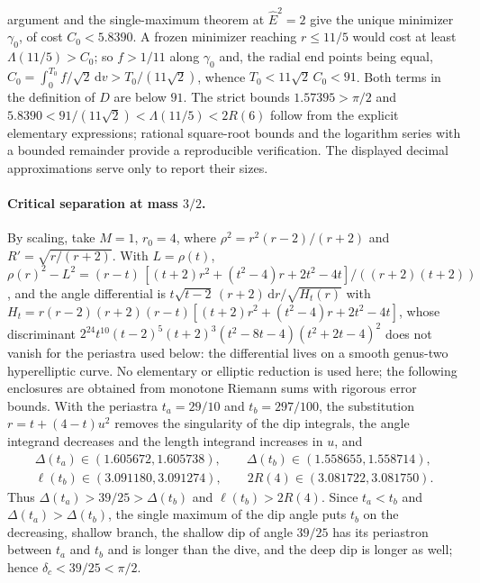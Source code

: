 \documentclass[aip,jmp,amsmath,amssymb,reprint]{revtex4-2}
\newcommand{\Ehat}{\hat E}
\newcommand{\dd}{\mathrm{d}}
\theoremstyle{plain}
\theoremstyle{definition}
\begin{document}
argument and the single-maximum theorem at $\Ehat^2=2$ give the unique minimizer $\gamma_0$, of cost
$C_0<5.8390$. A frozen minimizer reaching $r\le11/5$ would cost at least $\Lambda(11/5)>C_0$; so $f>1/11$ along $\gamma_0$
and, the radial end points being equal, $C_0=\int_0^{T_0}f/\sqrt2\,\dd v>T_0/(11\sqrt2)$, whence $T_0<11\sqrt2\,C_0<91$.
Both terms in the definition of $D$ are below $91$. The strict bounds $1.57395>\pi/2$ and
$5.8390<91/(11\sqrt2)<\Lambda(11/5)<2R(6)$ follow from the explicit elementary expressions; rational square-root
bounds and the logarithm series with a bounded remainder provide a reproducible verification. The
displayed decimal approximations serve only to report their sizes.

\paragraph{Critical separation at mass $3/2$.} By scaling, take $M=1$, $r_0=4$, where
$\rho^2=r^2(r-2)/(r+2)$ and $R'=\sqrt{r/(r+2)}$. With $L=\rho(t)$, $\rho(r)^2-L^2=(r-t)\,[(t+2)r^2+(t^2-4)r+2t^2-4t]/((r+2)(t+2))$, and the angle
differential is $t\sqrt{t-2}\,(r+2)\,\dd r/\sqrt{H_t(r)}$ with $H_t=r(r-2)(r+2)(r-t)[(t+2)r^2+(t^2-4)r+2t^2-4t]$, whose
discriminant $2^{24}t^{10}(t-2)^5(t+2)^3(t^2-8t-4)(t^2+2t-4)^2$ does not vanish for the periastra used below: the
differential lives on a smooth genus-two hyperelliptic curve. No elementary or elliptic reduction is used
here; the following enclosures are obtained from monotone Riemann sums with rigorous error bounds. With the periastra $t_a=29/10$ and
$t_b=297/100$, the substitution $r=t+(4-t)u^2$ removes the singularity of the dip integrals, the angle integrand decreases and the
length integrand increases in $u$, and
\begin{gather*}
 \Delta(t_a)\in(1.605672,1.605738),\qquad \Delta(t_b)\in(1.558655,1.558714),\\
 \ell(t_b)\in(3.091180,3.091274),\qquad 2R(4)\in(3.081722,3.081750).
\end{gather*}
Thus $\Delta(t_a)>39/25>\Delta(t_b)$ and $\ell(t_b)>2R(4)$. Since $t_a<t_b$ and $\Delta(t_a)>\Delta(t_b)$, the single maximum of the dip angle puts $t_b$ on the decreasing,
shallow branch, the shallow dip of angle $39/25$ has its periastron between $t_a$ and $t_b$ and is longer
than the dive, and the deep dip is longer as well; hence $\delta_c<39/25<\pi/2$.
\end{document}
